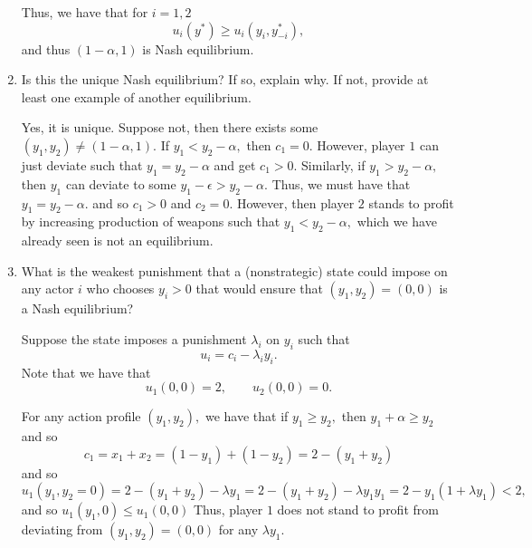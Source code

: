 \documentclass[11pt]{article}
\begin{document}
\begin{problem}
\begin{enumerate}
\begin{solution}
        Thus, we have that for $i = 1,2$
        \[u_i(y^*) \geq u_i(y_i, y_{-i}^*),\] and thus $(1-\alpha, 1)$ is Nash equilibrium.
    \end{solution}
    \item 
    Is this the unique Nash equilibrium? If so, explain why. If not, provide at least one example of another equilibrium.
    \begin{solution}
          Yes, it is unique. Suppose not, then there exists some $(y_1, y_2) \neq (1-\alpha, 1).$ If $y_1 < y_2-\alpha,$ then $c_1 = 0.$ However, player $1$ can just deviate such that $y_1 = y_2 - \alpha$ and get $c_1 >0.$ Similarly, if $y_1 > y_2 - \alpha,$ then $y_1$ can deviate to some $y_1 -\epsilon >y_2 - \alpha.$ Thus, we must have that $y_1 = y_2 - \alpha.$ and so $c_1 >0$ and $c_2 = 0.$ However, then player $2$ stands to profit by increasing production of weapons such that $y_1 < y_2 - \alpha,$ which we have already seen is not an equilibrium.
    \end{solution}

    \item 
    What is the weakest punishment that a (nonstrategic) state could impose on any actor \( i \) who chooses \( y_i > 0 \) that would ensure that \( (y_1, y_2) = (0, 0) \) is a Nash equilibrium?
    \begin{solution}
        Suppose the state imposes a punishment $\lambda_i$ on $y_i$ such that 
        \[u_i = c_i - \lambda_i y_i .\] Note that we have that 
        \[u_1(0,0) = 2, \qquad u_2(0,0) = 0.\]
        
        For any action profile $(y_1, y_2),$ we have that if $y_1 \geq y_2,$ then $y_1 + \alpha \geq y_2$ and so 
        \[c_1 = x_1 + x_2 = (1 - y_1) + (1-y_2) = 2 - (y_1 + y_2)\] and so 
        \[u_1(y_1, y_2 = 0) = 2-(y_1 + y_2) - \lambda y_1 = 2-(y_1  + y_2) - \lambda y_1 y_1 = 2-y_1(1 + \lambda y_1) <2,\] and so $u_1(y_1, 0) \leq u_1(0,0)$ Thus, player $1$ does not stand to profit from deviating from $(y_1, y_2) = (0,0)$ for any $\lambda
        y_1.$


\end{solution}
\end{enumerate}
\end{problem}
\end{document}
